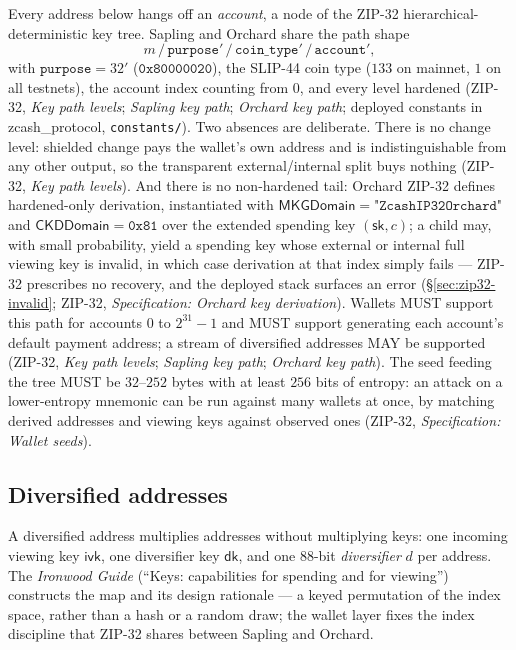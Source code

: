 \documentclass[11pt,a4paper]{article}
\theoremstyle{definition}
\newcommand{\ivk}{\ensuremath{\mathsf{ivk}}}
\newcommand{\dk}{\ensuremath{\mathsf{dk}}}
\begin{document}
Every address below hangs off an \emph{account}, a node of the ZIP-32
hierarchical-deterministic key tree. Sapling and Orchard share the path
shape
\[
m \,/\, \mathtt{purpose}' \,/\, \mathtt{coin\_type}' \,/\,
\mathtt{account}',
\]
with $\mathtt{purpose} = 32'$ ($\mathtt{0x80000020}$), the SLIP-44 coin
type ($133$ on mainnet, $1$ on all testnets), the account index counting
from $0$, and every level hardened (ZIP-32, \emph{Key path levels};
\emph{Sapling key path}; \emph{Orchard key path}; deployed constants in
\textsf{zcash\_protocol}, \texttt{constants/}). Two absences are
deliberate. There is no change level: shielded change pays the wallet's own
address and is indistinguishable from any other output, so the transparent
external/internal split buys nothing (ZIP-32, \emph{Key path levels}). And
there is no non-hardened tail: Orchard ZIP-32 defines hardened-only
derivation, instantiated with
$\mathsf{MKGDomain} = \texttt{"ZcashIP32Orchard"}$ and
$\mathsf{CKDDomain} = \mathtt{0x81}$ over the extended spending key
$(\mathsf{sk}, c)$; a child may, with small probability, yield a spending
key whose external or internal full viewing key is invalid, in which case
derivation at that index simply fails --- ZIP-32 prescribes no recovery,
and the deployed stack surfaces an error (\S\ref{sec:zip32-invalid};
ZIP-32, \emph{Specification: Orchard key derivation}). Wallets MUST
support this path for accounts $0$ to
$2^{31}-1$ and MUST support generating each account's default payment
address; a stream of diversified addresses MAY be supported (ZIP-32,
\emph{Key path levels}; \emph{Sapling key path}; \emph{Orchard key path}).
The seed feeding the tree MUST be $32$--$252$ bytes with at least $256$
bits of entropy: an attack on a lower-entropy mnemonic can be run against
many wallets at once, by matching derived addresses and viewing keys
against observed ones (ZIP-32, \emph{Specification: Wallet seeds}).

\subsection{Diversified addresses}\label{sec:addresses-diversified}

A diversified address multiplies addresses without multiplying keys: one
incoming viewing key $\ivk$, one diversifier key $\dk$, and one $88$-bit
\emph{diversifier} $d$ per address. The \emph{Ironwood Guide} (``Keys:
capabilities for spending and for viewing'') constructs the map and its
design rationale --- a keyed permutation of the index space, rather than a
hash or a random draw; the wallet layer fixes the index discipline that
ZIP-32 shares between Sapling and Orchard.
\end{document}
